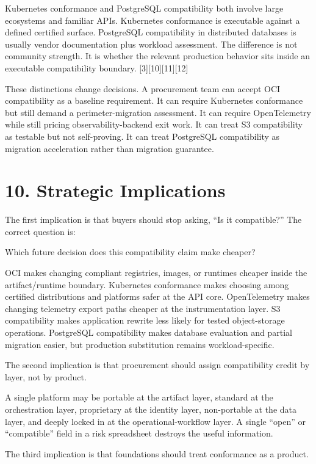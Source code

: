 \documentclass[11pt]{article}
\begin{document}
Kubernetes conformance and PostgreSQL compatibility both involve large ecosystems and familiar APIs. Kubernetes conformance is executable against a defined certified surface. PostgreSQL compatibility in distributed databases is usually vendor documentation plus workload assessment. The difference is not community strength. It is whether the relevant production behavior sits inside an executable compatibility boundary. {[}3{]}{[}10{]}{[}11{]}{[}12{]}

These distinctions change decisions. A procurement team can accept OCI compatibility as a baseline requirement. It can require Kubernetes conformance but still demand a perimeter-migration assessment. It can require OpenTelemetry while still pricing observability-backend exit work. It can treat S3 compatibility as testable but not self-proving. It can treat PostgreSQL compatibility as migration acceleration rather than migration guarantee.

\section{10. Strategic Implications}\label{strategic-implications}

The first implication is that buyers should stop asking, ``Is it compatible?'' The correct question is:

Which future decision does this compatibility claim make cheaper?

OCI makes changing compliant registries, images, or runtimes cheaper inside the artifact/runtime boundary. Kubernetes conformance makes choosing among certified distributions and platforms safer at the API core. OpenTelemetry makes changing telemetry export paths cheaper at the instrumentation layer. S3 compatibility makes application rewrite less likely for tested object-storage operations. PostgreSQL compatibility makes database evaluation and partial migration easier, but production substitution remains workload-specific.

The second implication is that procurement should assign compatibility credit by layer, not by product.

A single platform may be portable at the artifact layer, standard at the orchestration layer, proprietary at the identity layer, non-portable at the data layer, and deeply locked in at the operational-workflow layer. A single ``open'' or ``compatible'' field in a risk spreadsheet destroys the useful information.

The third implication is that foundations should treat conformance as a product.
\end{document}
